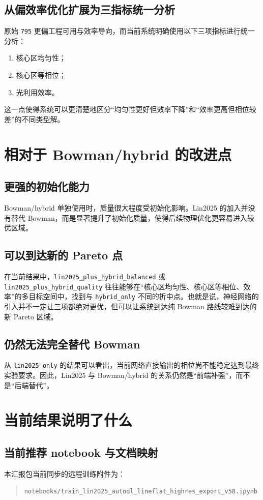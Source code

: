 \documentclass[12pt,a4paper]{ctexart}
\begin{document}
\subsection{从偏效率优化扩展为三指标统一分析}
原始 \texttt{795} 更偏工程可用与效率导向，而当前系统明确使用以下三项指标进行统一分析：
\begin{enumerate}[label=\arabic*.]
    \item 核心区均匀性；
    \item 核心区等相位；
    \item 光利用效率。
\end{enumerate}

这一点使得系统可以更清楚地区分“均匀性更好但效率下降”和“效率更高但相位较差”的不同类型解。

\section{相对于 Bowman/hybrid 的改进点}

\subsection{更强的初始化能力}
Bowman/hybrid 单独使用时，质量很大程度受初始化影响。Lin2025 的加入并没有替代 Bowman，而是显著提升了初始化质量，使得后续物理优化更容易进入较优区域。

\subsection{可以到达新的 Pareto 点}
在当前结果中，\texttt{lin2025\_plus\_hybrid\_balanced} 或 \texttt{lin2025\_plus\_hybrid\_quality} 往往能够在“核心区均匀性、核心区等相位、效率”的多目标空间中，找到与 \texttt{hybrid\_only} 不同的折中点。也就是说，神经网络的引入并不一定让三项都绝对更优，但可以让系统到达纯 Bowman 路线较难到达的新 Pareto 区域。

\subsection{仍然无法完全替代 Bowman}
从 \texttt{lin2025\_only} 的结果可以看出，当前网络直接输出的相位尚不能稳定达到最终实验要求。因此，Lin2025 与 Bowman/hybrid 的关系仍然是“前端补强”，而不是“后端替代”。

\section{当前结果说明了什么}

\subsection{当前推荐 notebook 与文档映射}
本汇报包当前同步的远程训练附件为：
\begin{quote}
\texttt{notebooks/train\_lin2025\_autodl\_lineflat\_highres\_export\_v58.ipynb}
\end{quote}
\end{document}
